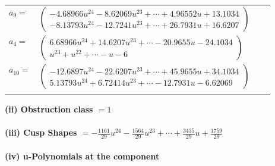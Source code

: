 \documentclass[1p]{elsarticle_modified}
\theoremstyle{definition}
\begin{document}
\begin{tabular}{m{7pt} m{180pt} m{7pt} m{180pt} }
\flushright $a_{9}=$&$\begin{pmatrix}-4.68966 u^{24}-8.62069 u^{23}+\cdots+4.96552 u+13.1034\\-8.13793 u^{24}-12.7241 u^{23}+\cdots+26.7931 u+16.6207\end{pmatrix}$ \\
\flushright $a_{4}=$&$\begin{pmatrix}6.68966 u^{24}+14.6207 u^{23}+\cdots-20.9655 u-24.1034\\u^{23}+u^{22}+\cdots- u-6\end{pmatrix}$ \\
\flushright $a_{10}=$&$\begin{pmatrix}-12.6897 u^{24}-22.6207 u^{23}+\cdots+45.9655 u+34.1034\\5.13793 u^{24}+6.72414 u^{23}+\cdots-12.7931 u-6.62069\end{pmatrix}$\\&\end{tabular}
\flushleft \textbf{(ii) Obstruction class $= 1$}\\~\\
\flushleft \textbf{(iii) Cusp Shapes $= -\frac{1161}{29} u^{24}-\frac{1564}{29} u^{23}+\cdots+\frac{3435}{29} u+\frac{1759}{29}$}\\~\\
\newpage\renewcommand{\arraystretch}{1}
\flushleft \textbf{(iv) u-Polynomials at the component}\newline \\
\end{document}
